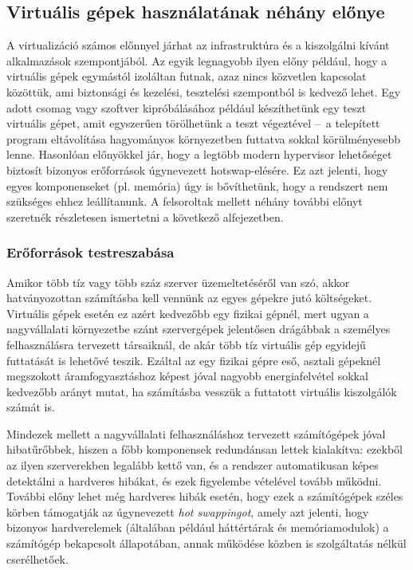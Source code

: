 \subsection{Virtuális gépek használatának néhány előnye}
A virtualizáció számos előnnyel járhat az infrastruktúra és a kiszolgálni kívánt alkalmazások szempontjából. Az egyik legnagyobb ilyen előny például, hogy a virtuális gépek egymástól izoláltan futnak, azaz nincs közvetlen kapcsolat közöttük, ami biztonsági és kezelési, tesztelési szempontból is kedvező lehet. Egy adott csomag vagy szoftver kipróbálásához például készíthetünk egy teszt virtuális gépet, amit egyszerűen törölhetünk a teszt végeztével --~a telepített program eltávolítása hagyományos környezetben futtatva sokkal körülményesebb lenne. Hasonlóan előnyökkel jár, hogy a legtöbb modern \gls{hypervisor} lehetőséget biztosít bizonyos erőforrások úgynevezett \gls{hotswap}-elésére. Ez azt jelenti, hogy egyes komponenseket (pl. memória) úgy is bővíthetünk, hogy a rendszert nem szükséges ehhez leállítanunk.
A felsoroltak mellett néhány további előnyt szeretnék részletesen ismertetni a következő alfejezetben.

\subsubsection{Erőforrások testreszabása}
Amikor több tíz vagy több száz szerver üzemeltetéséről van szó, akkor hatványozottan számításba kell vennünk az egyes gépekre jutó költségeket. Virtuális gépek esetén ez azért kedvezőbb egy fizikai gépnél, mert ugyan a nagyvállalati környezetbe szánt szervergépek jelentősen drágábbak a személyes felhasználásra tervezett társaiknál, de akár több tíz virtuális gép egyidejű futtatását is lehetővé teszik. Ezáltal az egy fizikai gépre eső, asztali gépeknél megszokott áramfogyasztáshoz képest jóval nagyobb energiafelvétel sokkal kedvezőbb arányt mutat, ha számításba vesszük a futtatott virtuális kiszolgálók számát is.

Mindezek mellett a nagyvállalati felhasználáshoz tervezett számítógépek jóval hibatűrőbbek, hiszen a főbb komponensek redundánsan lettek kialakítva: ezekből az ilyen szerverekben legalább kettő van, és a rendszer automatikusan képes detektálni a hardveres hibákat, és ezek figyelembe vételével tovább működni. További előny lehet még hardveres hibák esetén, hogy ezek a számítógépek széles körben támogatják az úgynevezett \textit{hot swappingot}, amely azt jelenti, hogy bizonyos hardverelemek (általában például háttértárak és memóriamodulok) a számítógép bekapcsolt állapotában, annak működése közben is szolgáltatás nélkül cserélhetőek.


